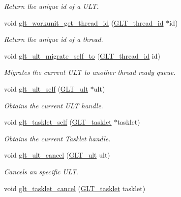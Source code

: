 \begin{DoxyCompactItemize}
\begin{DoxyCompactList}\small\item\em Return the unique id of a U\-L\-T. \end{DoxyCompactList}\item 
void \hyperlink{group__WORKUNIT_gaed08a54f94a57450eeec8a3cf5c0b167}{glt\-\_\-workunit\-\_\-get\-\_\-thread\-\_\-id} (\hyperlink{group__OBJECTS_gafd85fa9f78bc9be3fb9ae69076b03ee3}{G\-L\-T\-\_\-thread\-\_\-id} $\ast$id)
\begin{DoxyCompactList}\small\item\em Return the unique id of a thread. \end{DoxyCompactList}\item 
void \hyperlink{group__WORKUNIT_ga543ea1b8d0351394a59613845a68f540}{glt\-\_\-ult\-\_\-migrate\-\_\-self\-\_\-to} (\hyperlink{group__OBJECTS_gafd85fa9f78bc9be3fb9ae69076b03ee3}{G\-L\-T\-\_\-thread\-\_\-id} id)
\begin{DoxyCompactList}\small\item\em Migrates the current U\-L\-T to another thread ready queue. \end{DoxyCompactList}\item 
void \hyperlink{group__WORKUNIT_ga5f5f047114b71a62a163f54654576cc2}{glt\-\_\-ult\-\_\-self} (\hyperlink{group__OBJECTS_gaa560da37f581d1cbf86b736270c7d78c}{G\-L\-T\-\_\-ult} $\ast$ult)
\begin{DoxyCompactList}\small\item\em Obtains the current U\-L\-T handle. \end{DoxyCompactList}\item 
void \hyperlink{group__WORKUNIT_gac10751fbab2f7a71643c953d37acd0ee}{glt\-\_\-tasklet\-\_\-self} (\hyperlink{group__OBJECTS_gaea74ef1c9247a6c3f8f9aa243ec3491c}{G\-L\-T\-\_\-tasklet} $\ast$tasklet)
\begin{DoxyCompactList}\small\item\em Obtains the current Tasklet handle. \end{DoxyCompactList}\item 
void \hyperlink{group__WORKUNIT_ga1e92677c1a0b68ce201dd42a88088167}{glt\-\_\-ult\-\_\-cancel} (\hyperlink{group__OBJECTS_gaa560da37f581d1cbf86b736270c7d78c}{G\-L\-T\-\_\-ult} ult)
\begin{DoxyCompactList}\small\item\em Cancels an specific U\-L\-T. \end{DoxyCompactList}\item 
void \hyperlink{group__WORKUNIT_ga84a1d0464521ac71a2d80bef936d4855}{glt\-\_\-tasklet\-\_\-cancel} (\hyperlink{group__OBJECTS_gaea74ef1c9247a6c3f8f9aa243ec3491c}{G\-L\-T\-\_\-tasklet} tasklet)

\end{DoxyCompactItemize}
